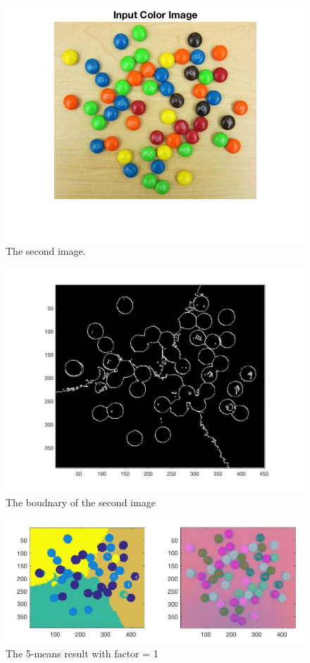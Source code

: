 \documentclass{article}
\begin{document}
\begin{figure}[htbp]
    \centering
    \includegraphics[scale = 0.25]{fig11.jpg}
    \caption{The second image.}
    \label{fig11}
\end{figure}

\begin{figure}[htbp]
    \centering
    \includegraphics[scale = 0.25]{fig13.jpg}
    \caption{The boudnary of the second image}
    \label{fig12}
\end{figure}

\begin{figure}[htbp]
    \centering
    \includegraphics[scale = 0.25]{fig12.jpg}
    \caption{The 5-means result with factor = 1}
    \label{fig13}
\end{figure}
\end{document}
